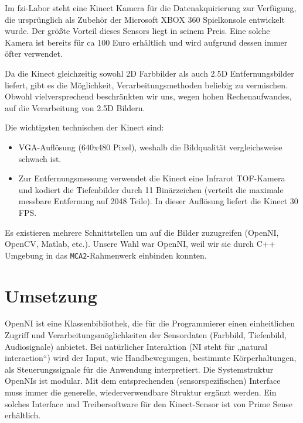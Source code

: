 Im \gls{fzi}-Labor steht eine Kinect Kamera für die Datenakquirierung zur
 Verfügung, die ursprünglich als Zubehör der Microsoft XBOX 360 Spielkonsole
 entwickelt wurde. Der größte Vorteil dieses Sensors liegt in seinem Preis. Eine
 solche Kamera ist bereits für ca 100 Euro erhältlich und wird aufgrund dessen
 immer öfter verwendet.
 
Da die Kinect gleichzeitig sowohl 2D Farbbilder als auch 2.5D Entfernungsbilder liefert, gibt es die Möglichkeit, Verarbeitungsmethoden beliebig zu vermischen.
 Obwohl vielversprechend beschränkten wir uns, wegen hohen Rechenaufwandes, auf
 die Verarbeitung von 2.5D Bildern.
\vspace{0.3cm}

\noindent Die wichtigsten technischen der Kinect sind:
\begin{itemize}
  \item VGA-Auflösung (640x480 Pixel), weshalb die Bildqualität vergleichsweise
  schwach ist.
  \item Zur Entfernungsmessung verwendet die Kinect eine Infrarot TOF-Kamera und kodiert
  die Tiefenbilder durch 11 Binärzeichen (verteilt die maximale messbare
  Entfernung auf 2048 Teile). In dieser Auflösung liefert die Kinect 30 FPS.
\end{itemize}

Es existieren mehrere Schnittstellen um auf die Bilder zuzugreifen (OpenNI, OpenCV, Matlab, etc.).
 Unsere Wahl war OpenNI, weil wir sie durch C++ Umgebung in das
 \lstinline{MCA2}-Rahmenwerk einbinden konnten.

\section{Umsetzung}
\label{kinect_umsetzung_sec}
\authorsection{\editordummy}

OpenNI ist eine Klassenbibliothek, die für die Programmierer einen einheitlichen Zugriff und Verarbeitungsmöglichkeiten
 der Sensordaten (Farbbild, Tiefenbild, Audiosignale) anbietet. Bei natürlicher Interaktion (NI steht für „natural interaction“) wird der Input,
 wie Handbewegungen, bestimmte Körperhaltungen, als Steuerungssignale für die Anwendung interpretiert. Die Systemstruktur OpenNIs ist modular.
 Mit dem entsprechenden (sensorspezifischen) Interface muss immer die generelle, wiederverwendbare Struktur ergänzt werden.
 Ein solches Interface und Treibersoftware für den Kinect-Sensor ist von Prime
 Sense erhältlich. 

